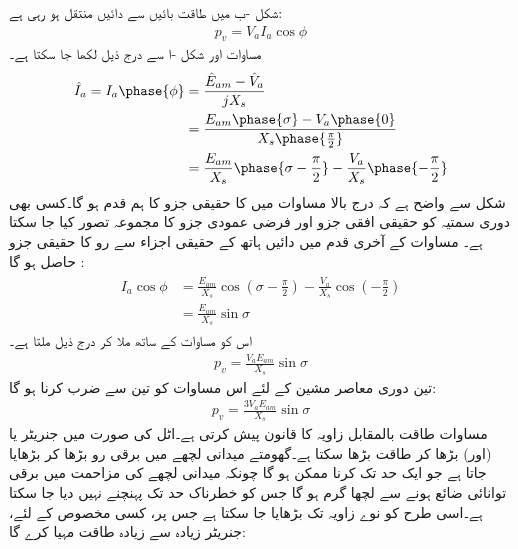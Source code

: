  شکل -ب میں طاقت  بائیں سے دائیں منتقل ہو رہی ہے:
\begin{align}\label{مساوات_معاصر_طاقت_کی_منتقلی_الف}
p_v=V_a I_a \cos \phi
\end{align}
مساوات  اور شکل -ا  سے درج ذیل لکھا جا سکتا ہے۔
\begin{gather}
\begin{aligned}\label{مساوات_معاصر_رو_بالمقابل_دو_دباو}
\hat{I}_a=I_a \phase{\phi}&=\frac{\hat{E}_{am}-\hat{V}_a}{j X_s}\\
&=\frac{E_{am} \phase{\sigma} -V_a \phase {0}}{X_s \phase{\frac{\pi}{2}}}\\
&=\frac{E_{am}}{X_s} \phase{\sigma-\frac{\pi}{2}} -\frac{V_a}{X_s} \phase {-\frac{\pi}{2}}
\end{aligned}
\end{gather}
شکل  سے واضح ہے کہ درج بالا مساوات میں  کا حقیقی جزو   کا ہم قدم ہو گا۔کسی بھی  دوری سمتیہ  کو  حقیقی افقی جزو  اور فرضی عمودی جزو  کا مجموعہ تصور کیا جا سکتا ہے۔ مساوات  کے آخری قدم میں دائیں ہاتھ کے حقیقی اجزاء سے رو کا حقیقی جزو حاصل ہو گا :
\begin{gather}
\begin{aligned}
I_a \cos \phi&=\frac{E_{am}}{X_s} \cos \left(\sigma -\frac{\pi}{2} \right)-\frac{V_a}{X_s} \cos \left(-\frac{\pi}{2} \right)\\
&=\frac{E_{am}}{X_s} \sin \sigma
\end{aligned}
\end{gather}
اس کو مساوات   کے ساتھ ملا کر درج ذیل ملتا ہے۔
\begin{align}\label{مساوات_معاصر_سائن_خصوصیات}
p_v=\frac{V_a E_{am}}{X_s} \sin \sigma
\end{align}
تین دوری معاصر مشین کے لئے اس مساوات کو تین سے ضرب کرنا ہو گا:
\begin{align}\label{مساوات_معاصر_طاقت_بالمقابل_زاویہ}
p_v=\frac{3 V_a E_{am}}{X_s} \sin \sigma
\end{align}
مساوات  طاقت بالمقابل زاویہ کا قانون پیش کرتی ہے۔اٹل  کی صورت میں جنریٹر  یا (اور)  بڑھا کر طاقت بڑھا سکتا ہے۔گھومتے میدانی لچھے میں برقی رو بڑھا کر   بڑھایا جاتا ہے جو ایک حد تک کرنا ممکن ہو گا چونکہ میدانی  لچھے کی مزاحمت میں برقی توانائی ضائع ہونے سے لچھا گرم ہو گا جس کو خطرناک حد تک پہنچنے نہیں دیا جا سکتا ہے۔اسی طرح   کو نوے زاویہ تک بڑھایا  جا سکتا ہے جس پر، کسی مخصوص  کے لئے، جنریٹر زیادہ سے زیادہ طاقت مہیا کرے گا:
